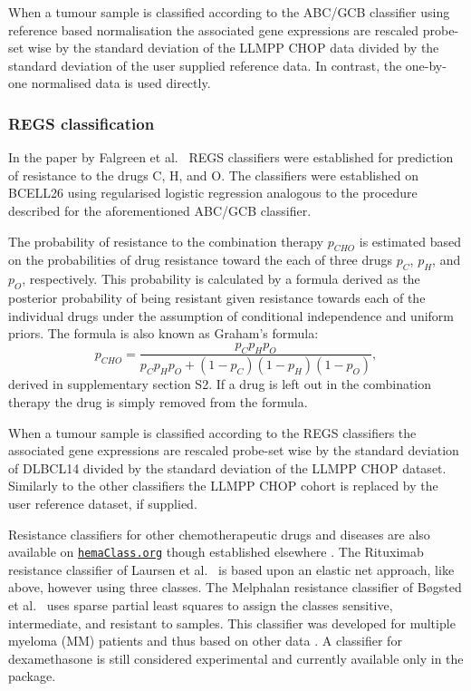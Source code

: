 \documentclass[twocolumn]{bmcart}%
\newcommand{\hemaClass}{\href{http://hemaClass.org}{\texttt{hemaClass.org}}}
\begin{document}
When a tumour sample is classified according to the ABC/GCB classifier using reference based normalisation the associated gene expressions are rescaled probe-set wise by the standard deviation of the LLMPP CHOP data divided by the standard deviation of the user supplied reference data.
In contrast, the one-by-one normalised data is used directly.



\subsubsection{REGS classification}
\label{sec:regsmethods}
In the paper by Falgreen et al.~\cite{Falgreen2015} REGS classifiers were established for prediction of resistance to the drugs C, H, and O.
The classifiers were established on BCELL26 using regularised logistic regression analogous to the procedure described for the aforementioned ABC/GCB classifier.

The probability of resistance to the combination therapy $p_{CHO}$ is estimated based on the probabilities of drug resistance toward the each of three drugs $p_C$, $p_H$, and $p_O$, respectively.
This probability is calculated by a formula derived as the posterior probability of being resistant given resistance towards each of the individual drugs under the assumption of conditional independence and uniform priors.
The formula is also known as Graham's formula:
\begin{equation*}
  p_{CHO} = \frac{p_C p_H p_O}{p_C p_H p_O + (1 - p_C)(1 - p_H)(1 - p_O)},
\end{equation*}
derived in supplementary section S2.%
If a drug is left out in the combination therapy the drug is simply removed from the formula.

When a tumour sample is classified according to the REGS classifiers the associated gene expressions are rescaled probe-set wise by the standard deviation of DLBCL14 divided by the standard deviation of the LLMPP CHOP dataset.
Similarly to the other classifiers the LLMPP CHOP cohort is replaced by the user reference dataset, if supplied.

Resistance classifiers for other chemotherapeutic drugs and diseases are also available on \hemaClass{} though established elsewhere \cite{Boegsted2011,Bogsted2013,Laursen2014}.
The Rituximab resistance classifier of Laursen et al.~\cite{Laursen2014} is based upon an elastic net approach, like above, however using three classes.
The Melphalan resistance classifier of B{\o}gsted et al.~\cite{Boegsted2011} uses sparse partial least squares to assign the classes sensitive, intermediate, and resistant to samples.
This classifier was developed for multiple myeloma (MM) patients and thus based on other data \cite{Boegsted2011}.
A classifier for dexamethasone is still considered experimental and currently available only in the package.
\end{document}
